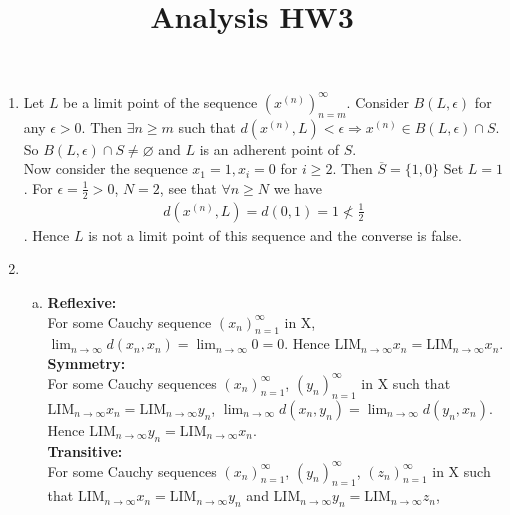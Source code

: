 \documentclass[A4paper,12pt]{article}
\title{Analysis HW3}
\author{}
\date{}
\theoremstyle{definition}
\numberwithin{equation}{section}
\begin{document}
\maketitle
\begin{enumerate}[(1)]
    \item
        Let $L$ be a limit point of the sequence $(x^{(n)})_{n=m}^\infty$.
        Consider $B(L, \epsilon)$ for any $\epsilon>0$. 
        Then $\exists  n \ge m$ such that $d(x^{(n)}, L) < \epsilon \Rightarrow x^{(n)} \in B(L, \epsilon) \cap S$. 
        So $B(L, \epsilon)  \cap S \neq \varnothing$ and $L$ is an adherent point of $S$.
        \\
        Now consider the sequence $x_1 = 1, x_i = 0$ for $i\ge 2$.
        Then $\overline{S} = \{1, 0\}$
        Set $L = 1$.
        For $\epsilon = \frac{1}{2} > 0$, $N = 2$,  see that $\forall n\ge N$ we have 
        \begin{align*}
            d(x^{(n)}, L) = d(0, 1) = 1 \not < \frac{1}{2}
        \end{align*}
        . Hence $L$ is not a limit point of this sequence and the converse is false.
    \item
        \begin{enumerate}[(a)]
            \item
                \textbf{Reflexive: }\\
                For some Cauchy sequence $(x_n)_{n=1}^\infty$ in X, 
                $\lim_{n \rightarrow \infty} d(x_n, x_n) = \lim_{n \rightarrow \infty} 0 = 0$.
                Hence $\mathrm{LIM}_{n \rightarrow \infty} x_n = \mathrm{LIM}_{n \rightarrow \infty} x_n$.
                \\
                \textbf{Symmetry: }\\
                For some Cauchy sequences $(x_n)_{n=1}^\infty$, $(y_n)_{n=1}^\infty$ in X such that $\mathrm{LIM}_{n\rightarrow \infty} x_n = \mathrm{LIM}_{n\rightarrow \infty} y_n$, 
                $\lim_{n \rightarrow \infty} d(x_n, y_n) = \lim_{n \rightarrow \infty} d(y_n, x_n)$.  
                Hence $\mathrm{LIM}_{n \rightarrow \infty} y_n = \mathrm{LIM}_{n \rightarrow \infty} x_n$.
                \\
                \textbf{Transitive: }\\
                For some Cauchy sequences $(x_n)_{n=1}^\infty$, $(y_n)_{n=1}^\infty$, $(z_n)_{n=1}^\infty$ in X such that $\mathrm{LIM}_{n \rightarrow \infty} x_n = \mathrm{LIM}_{n \rightarrow \infty} y_n$ and $\mathrm{LIM}_{n \rightarrow \infty} y_n = \mathrm{LIM}_{n \rightarrow \infty} z_n$, 

\end{enumerate}
\end{enumerate}
\end{document}

